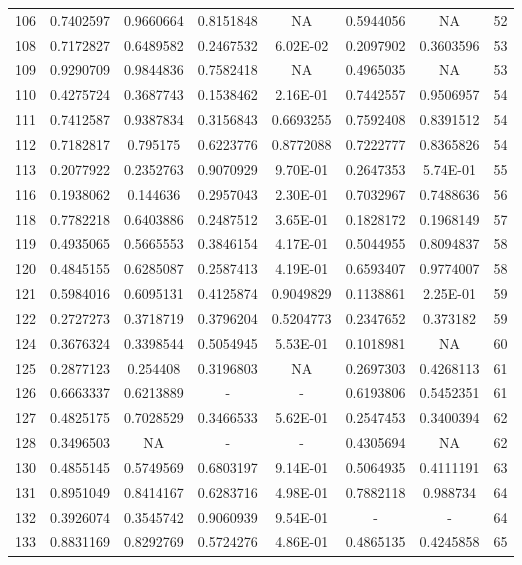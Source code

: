 \begin{anexosenv}
{\begin{longtable}{cccccccc}
106 & 0.7402597 & 0.9660664 & 0.8151848 & NA & 0.5944056 & NA & 52 \\ 
108 & 0.7172827 & 0.6489582 & 0.2467532 & 6.02E-02 & 0.2097902 & 0.3603596 & 53 \\ 
109 & 0.9290709 & 0.9844836 & 0.7582418 & NA & 0.4965035 & NA & 53 \\ 
110 & 0.4275724 & 0.3687743 & 0.1538462 & 2.16E-01 & 0.7442557 & 0.9506957 & 54 \\ 
111 & 0.7412587 & 0.9387834 & 0.3156843 & 0.6693255 & 0.7592408 & 0.8391512 & 54 \\ 
112 & 0.7182817 & 0.795175 & 0.6223776 & 0.8772088 & 0.7222777 & 0.8365826 & 54 \\ 
113 & 0.2077922 & 0.2352763 & 0.9070929 & 9.70E-01 & 0.2647353 & 5.74E-01 & 55 \\ 
116 & 0.1938062 & 0.144636 & 0.2957043 & 2.30E-01 & 0.7032967 & 0.7488636 & 56 \\ 
118 & 0.7782218 & 0.6403886 & 0.2487512 & 3.65E-01 & 0.1828172 & 0.1968149 & 57 \\ 
119 & 0.4935065 & 0.5665553 & 0.3846154 & 4.17E-01 & 0.5044955 & 0.8094837 & 58 \\ 
120 & 0.4845155 & 0.6285087 & 0.2587413 & 4.19E-01 & 0.6593407 & 0.9774007 & 58 \\ 
121 & 0.5984016 & 0.6095131 & 0.4125874 & 0.9049829 & 0.1138861 & 2.25E-01 & 59 \\ 
122 & 0.2727273 & 0.3718719 & 0.3796204 & 0.5204773 & 0.2347652 & 0.373182 & 59 \\ 
124 & 0.3676324 & 0.3398544 & 0.5054945 & 5.53E-01 & 0.1018981 & NA & 60 \\ 
125 & 0.2877123 & 0.254408 & 0.3196803 & NA & 0.2697303 & 0.4268113 & 61 \\ 
126 & 0.6663337 & 0.6213889 & - & - &  0.6193806 & 0.5452351 & 61 \\ 
127 & 0.4825175 & 0.7028529 & 0.3466533 & 5.62E-01 & 0.2547453 & 0.3400394 & 62 \\ 
128 & 0.3496503 & NA & - & - &  0.4305694 & NA & 62 \\ 
130 & 0.4855145 & 0.5749569 & 0.6803197 & 9.14E-01 & 0.5064935 & 0.4111191 & 63 \\ 
131 & 0.8951049 & 0.8414167 & 0.6283716 & 4.98E-01 & 0.7882118 & 0.988734 & 64 \\ 
132 & 0.3926074 & 0.3545742 & 0.9060939 & 9.54E-01 & - & - &  64 \\ 
133 & 0.8831169 & 0.8292769 & 0.5724276 & 4.86E-01 & 0.4865135 & 0.4245858 & 65 \\ 

\end{longtable}}
\end{anexosenv}
